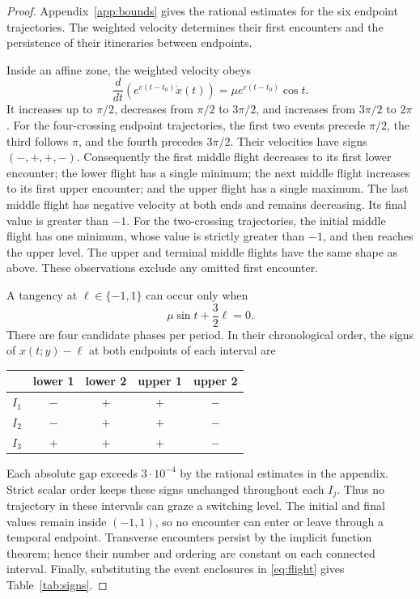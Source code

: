 \documentclass[11pt,a4paper]{article}
\begin{document}
\begin{proof}
Appendix~\ref{app:bounds} gives the rational estimates for the six
endpoint trajectories. The weighted velocity determines their first
encounters and the persistence of their itineraries between endpoints.

Inside an affine zone, the weighted velocity obeys
\begin{equation}\label{eq:shape}
 \frac d{dt}\left(e^{c(t-t_0)}\dot x(t)\right)
       =\mu e^{c(t-t_0)}\cos t.
\end{equation}
It increases up to $\pi/2$, decreases from $\pi/2$ to $3\pi/2$, and
increases from $3\pi/2$ to $2\pi$. For the four-crossing endpoint
trajectories, the first two events precede $\pi/2$, the third follows
$\pi$, and the fourth precedes $3\pi/2$. Their velocities have signs
$(-,+,+,-)$. Consequently the first middle flight decreases to its first
lower encounter; the lower flight has a single minimum; the next middle
flight increases to its first upper encounter; and the upper flight has
a single maximum. The last middle flight has negative velocity at both
ends and remains decreasing. Its final value is greater than $-1$.
For the two-crossing trajectories, the initial middle flight has one
minimum, whose value is strictly greater than $-1$, and then reaches the
upper level. The upper and terminal middle flights have the same shape
as above. These observations exclude any omitted first encounter.

A tangency at $\ell\in\{-1,1\}$ can occur only when
\begin{equation}\label{eq:phase}
 \mu\sin t+\frac32\ell=0.
\end{equation}
There are four candidate phases per period. In their chronological order,
the signs of $x(t;y)-\ell$ at both endpoints of each interval are
\begin{center}
\begin{tabular}{@{}lcccc@{}}\toprule
 & lower 1 & lower 2 & upper 1 & upper 2\\\midrule
$I_1$ & $-$ & $+$ & $+$ & $-$\\
$I_2$ & $-$ & $+$ & $+$ & $-$\\
$I_3$ & $+$ & $+$ & $+$ & $-$\\\bottomrule
\end{tabular}
\end{center}
Each absolute gap exceeds $3\cdot10^{-4}$ by the rational estimates
in the appendix. Strict scalar order keeps these signs unchanged
throughout each $I_j$. Thus no trajectory in these intervals can graze
a switching level. The initial and final values remain inside $(-1,1)$,
so no encounter can enter or leave through a temporal endpoint.
Transverse encounters persist by the implicit function theorem; hence
their number and ordering are constant on each connected interval.
Finally, substituting the event enclosures in \eqref{eq:flight} gives
Table~\ref{tab:signs}.
\end{proof}
\end{document}
